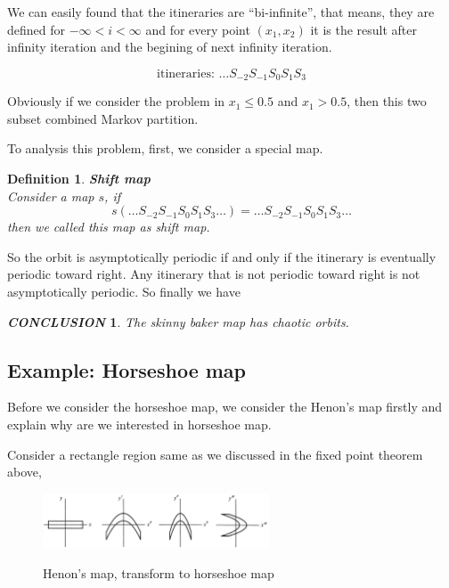 \documentclass[12pt]{article}
\theoremstyle{plain}
\newtheorem{definition}{{\color{red}\textbf{Definition}}}[section]
\newtheorem{conclusion}{\textit{\textbf{CONCLUSION}}}[section]
\begin{document}
We can easily found that the itineraries are ``bi-infinite'', that means, they are defined for $- \infty < i < \infty$ and for every point $(x_1, x_2)$ it is the result after infinity iteration and the begining of next infinity iteration.

$$
\text{itineraries: }\ldots S_{-2}S_{-1}S_0S_1S_3
$$


Obviously if we consider the problem in $x_1 \leq 0.5$ and $x_1 > 0.5$, then this two subset combined Markov partition.

To analysis this problem, first, we consider a special map.
\begin{definition}\textbf{Shift map}
\\\noindent Consider a map $s$, if
$$
s(\ldots S_{-2}S_{-1}S_0S_1S_3 \ldots) = \ldots S_{-2}S_{-1}S_0S_1S_3 \ldots
$$
then we called this map as shift map.
\end{definition}

So the orbit is asymptotically periodic if and only if the itinerary is eventually periodic toward right. Any itinerary that is not periodic toward right is not asymptotically periodic. So finally we have 

\begin{conclusion} The skinny baker map has chaotic orbits.
\end{conclusion}








\subsection{Example: Horseshoe map}
Before we consider the horseshoe map, we consider the Henon's map firstly and explain why are we interested in horseshoe map.

Consider a rectangle region same as we discussed in the fixed point theorem above, 

\begin{figure}[H]
\begin{center}
\includegraphics[width=0.6\textwidth]{figure/section5/henon-horseshoe.png} \\
\end{center}
\caption{Henon's map, transform to horseshoe map}
\end{figure}
\end{document}
